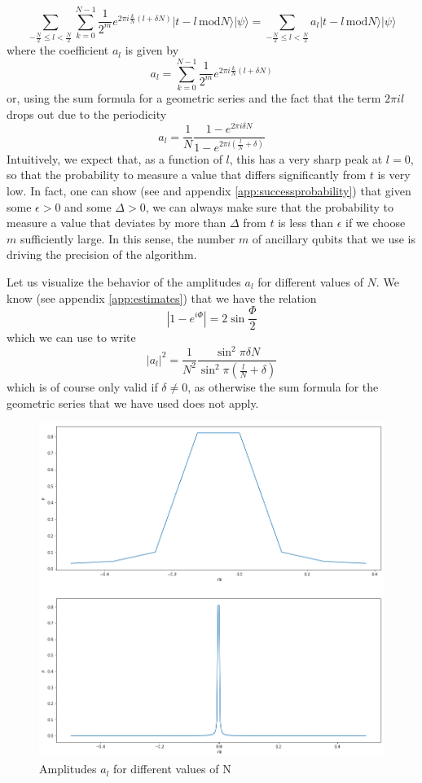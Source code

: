 \documentclass[a4paper, draft]{article}
\theoremstyle{own}
\theoremstyle{remark}
\begin{document}
$$
  \sum_{- \frac{N}{2} \leq l < \frac{N}{2}} \sum_{k=0}^{N-1} \frac{1}{2^m} e^{2\pi i \frac{k}{N}(l + \delta N)} | t - l \, \text{mod} N \rangle |\psi \rangle
=
\sum_{- \frac{N}{2} \leq l < \frac{N}{2}} a_l | t - l \, \text{mod} N \rangle |\psi \rangle
$$
where the coefficient $a_l$ is given by
$$
a_l = \sum_{k=0}^{N-1} \frac{1}{2^m} e^{2\pi i \frac{k}{N}(l + \delta N)}
$$
or, using the sum formula for a geometric series and the fact that the term $2\pi i l$ drops out due to the periodicity
$$
a_l = \frac{1}{N} \frac{1 - e^{2\pi i \delta N}}
{1 - e^{2\pi i (\frac{l}{N} + \delta) }}
$$
Intuitively, we expect that, as a function of $l$, this has a very sharp peak at $l = 0$, so that the probability to measure a value that differs significantly from $t$ is very low. In fact, one can show (see \cite{CleveEkert} and appendix \ref{app:successprobability}) that given some $\epsilon >0 $ and some $\Delta > 0$, we can always make sure that the probability to measure a value that deviates by more than $\Delta$ from $t$ is less than $\epsilon$ if we choose $m$ sufficiently large. In this sense, the number $m$ of ancillary qubits that we use is driving the precision of the algorithm.

Let us visualize the behavior of the amplitudes $a_l$ for different values of $N$. We know (see appendix \ref{app:estimates}) that we have the relation
$$
| 1- e^{i\Phi}| = 2 \sin \frac{\Phi}{2}
$$
which we can use to write
$$
|a_l|^2 = \frac{1}{N^2} \frac{\sin^2 \pi \delta N}{\sin^2 \pi (\frac{l}{N} + \delta)}
$$
which is of course only valid if $\delta \neq 0$, as otherwise the sum formula for the geometric series that we have used does not apply. 

\begin{figure}[ht]
\centering
\includegraphics[width=0.7\linewidth]{images/Amplitudes}
\caption[Amplitudes $a_l$ for different values of N]{Amplitudes $a_l$ for different values of N}
\label{fig:Amplitudes}
\end{figure}
\end{document}
